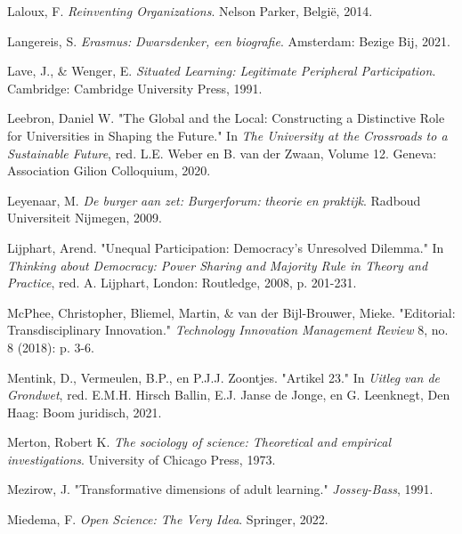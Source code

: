\documentclass[smallauthor, chapterhaspagenum, nochapterinheader, pagenuminheader,  bigchapnum,medium2, tocpages,  garamond, titleinheader]{jote-book}
\begin{document}
\begin{references}
		Laloux, F. \emph{Reinventing Organizations}. Nelson Parker, België, 2014.



		Langereis, S. \emph{Erasmus: }\emph{Dwarsdenker}\emph{, }\emph{een}\emph{ }\emph{biografie}. Amsterdam: Bezige Bij, 2021.



		Lave, J., \& Wenger, E. \emph{Situated Learning: Legitimate Peripheral Participation}. Cambridge: Cambridge University Press, 1991.



		Leebron, Daniel W. "The Global and the Local: Constructing a Distinctive Role for Universities in Shaping the Future." In \emph{The University at the Crossroads to a Sustainable Future}, red. L.E. Weber en B. van der Zwaan, Volume 12. Geneva: Association Gilion Colloquium, 2020.



		Leyenaar, M. \emph{De burger }\emph{aan}\emph{ }\emph{zet}\emph{: }\emph{Burgerforum}\emph{: }\emph{theorie}\emph{ }\emph{en}\emph{ }\emph{praktijk}. Radboud Universiteit Nijmegen, 2009.



		Lijphart, Arend. "Unequal Participation: Democracy's Unresolved Dilemma." In \emph{Thinking about Democracy: Power Sharing and }\emph{Majority Rule in Theory and Practice}, red. A. Lijphart, London: Routledge, 2008, p. 201-231.



		McPhee, Christopher, Bliemel, Martin, \& van der Bijl-Brouwer, Mieke. "Editorial: Transdisciplinary Innovation." \emph{Technology Innovation Management Review} 8, no. 8 (2018): p. 3-6.



		Mentink, D., Vermeulen, B.P., en P.J.J. Zoontjes. "Artikel 23." In \emph{Uitleg}\emph{ van de }\emph{Grondwet}, red. E.M.H. Hirsch Ballin, E.J. Janse de Jonge, en G. Leenknegt, Den Haag: Boom juridisch, 2021.



		Merton, Robert K. \emph{The sociology of science: Theoretical and empirical investigations}. University of Chicago Press, 1973.



		Mezirow, J. "Transformative dimensions of adult learning." \emph{Jossey-Bass}, 1991.



		Miedema, F. \emph{Open Science: The Very Idea}. Springer, 2022.




\end{references}
\end{document}
